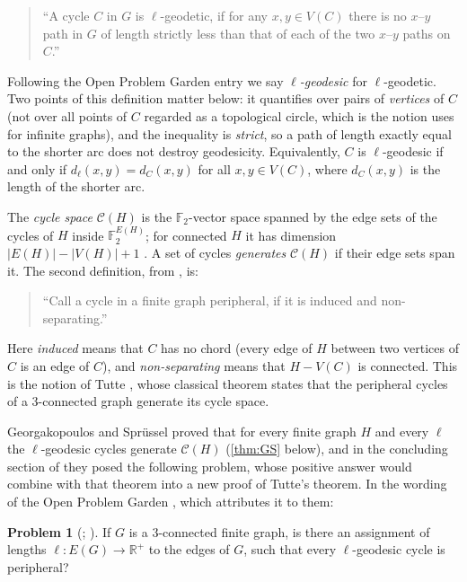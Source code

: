 \documentclass[11pt,a4paper]{article}
\theoremstyle{plain}
\theoremstyle{definition}
\newtheorem{problem}[theorem]{Problem}
\theoremstyle{remark}
\newcommand{\R}{\mathbb R}
\newcommand{\F}{\mathbb F_2}
\newcommand{\cyc}{\mathcal C}
\newcommand{\dl}{d_\ell}
\newcommand{\dC}{d_C}
\begin{document}
\begin{quote}
``A cycle $C$ in $G$ is $\ell$-geodetic, if for any $x,y\in V(C)$ there is no $x$--$y$ path in $G$ of length strictly less than that of each of the two $x$--$y$ paths on $C$.''
\end{quote}

\noindent Following the Open Problem Garden entry \cite{OPG} we say \emph{$\ell$-geodesic} for $\ell$-geodetic. Two points of this definition matter below: it quantifies over pairs of \emph{vertices} of $C$ (not over all points of $C$ regarded as a topological circle, which is the notion \cite[\S2]{GS09} uses for infinite graphs), and the inequality is \emph{strict}, so a path of length exactly equal to the shorter arc does not destroy geodesicity. Equivalently, $C$ is $\ell$-geodesic if and only if $\dl(x,y)=\dC(x,y)$ for all $x,y\in V(C)$, where $\dC(x,y)$ is the length of the shorter arc.

The \emph{cycle space} $\cyc(H)$ is the $\F$-vector space spanned by the edge sets of the cycles of $H$ inside $\F^{E(H)}$; for connected $H$ it has dimension $|E(H)|-|V(H)|+1$ \cite[\S1.9]{Diestel}. A set of cycles \emph{generates} $\cyc(H)$ if their edge sets span it. The second definition, from \cite[\S5]{GS09}, is:

\begin{quote}
``Call a cycle in a finite graph peripheral, if it is induced and non-separating.''
\end{quote}

\noindent Here \emph{induced} means that $C$ has no chord (every edge of $H$ between two vertices of $C$ is an edge of $C$), and \emph{non-separating} means that $H-V(C)$ is connected. This is the notion of Tutte \cite{Tutte63}, whose classical theorem states that the peripheral cycles of a $3$-connected graph generate its cycle space.

Georgakopoulos and Sprüssel \cite[Theorem~3.1]{GS09} proved that for every finite graph $H$ and every $\ell$ the $\ell$-geodesic cycles generate $\cyc(H)$ (\cref{thm:GS} below), and in the concluding section of \cite{GS09} they posed the following problem, whose positive answer would combine with that theorem into a new proof of Tutte's theorem. In the wording of the Open Problem Garden \cite{OPG}, which attributes it to them:

\begin{problem}[{\cite[Problem~3]{GS09}; \cite{OPG}}]\label{prob:GS}
If $G$ is a $3$-connected finite graph, is there an assignment of lengths $\ell\colon E(G)\to\R^+$ to the edges of $G$, such that every $\ell$-geodesic cycle is peripheral?
\end{problem}
\end{document}
